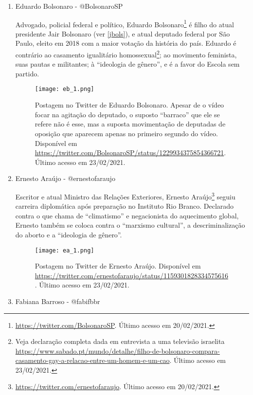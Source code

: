 \documentclass[
	12pt,				%
	openright,			%
	twoside,			%
	a4paper,			%
	english,			%
	brazil				%
	]{abntex2}
\begin{document}
\begin{anexosenv}
\begin{enumerate}
 \newpage
  
 \item Eduardo Bolsonaro - @BolsonaroSP
 
 Advogado, policial federal e político, Eduardo Bolsonaro\footnote{\url{https://twitter.com/BolsonaroSP}. Último acesso em 20/02/2021.} é filho do atual presidente Jair Bolsonaro (ver \ref{jbols}), e atual deputado federal por São Paulo, eleito em 2018 com a maior votação da história do país. Eduardo é contrário ao casamento igualitário homossexual\footnote{Veja declaração completa dada em entrevista a uma televisão israelita \url{https://www.sabado.pt/mundo/detalhe/filho-de-bolsonaro-compara-casamento-gay-a-relacao-entre-um-homem-e-um-cao}. Último acesso em 23/02/2021.}; ao movimento feminista, suas pautas e militantes; à ``ideologia de gênero'', e é a favor do Escola sem partido.
 
 \begin{figure}[!htbp]
    \centering
    \texttt{[image: eb\_1.png]}
    \caption{Postagem no Twitter de Eduardo Bolsonaro. Apesar de o vídeo focar na agitação do deputado, o suposto ``barraco'' que ele se refere não é esse, mas a suposta movimentação de deputadas de oposição que aparecem apenas no primeiro segundo do vídeo. Disponível em \url{https://twitter.com/BolsonaroSP/status/1229934375854366721}. Último acesso em 23/02/2021.}
 \end{figure}
  
 \item Ernesto Araújo - @ernestofaraujo
 
 Escritor e atual Ministro das Relações Exteriores, Ernesto Araújo\footnote{\url{https://twitter.com/ernestofaraujo}. Último acesso em 20/02/2021.} seguiu carreira diplomática após preparação no Instituto Rio Branco. Declarado contra o que chama de ``climatismo'' e negacionista do aquecimento global, Ernesto também se coloca contra o ``marxismo cultural'', a descriminalização do aborto e a ``ideologia de gênero''.
 
 \begin{figure}[!htbp]
    \centering
    \texttt{[image: ea\_1.png]}
    \caption{Postagem no Twitter de Ernesto Araújo. Disponível em \url{https://twitter.com/ernestofaraujo/status/1159301828334575616}. Último acesso em 23/02/2021.}
 \end{figure}
 
 \newpage
 
 \item Fabiana Barroso - @fabifbbr
 

\end{enumerate}
\end{anexosenv}
\end{document}
